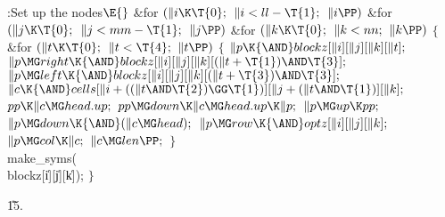 \B{}:Set up the  nodes\X${}\E{}$\6
\&{for} ${}(\|i\K\T{0};{}$ ${}\|i<\\{ll}-\T{1};{}$ ${}\|i\PP){}$\1\6
\&{for} ${}(\|j\K\T{0};{}$ ${}\|j<\\{mm}-\T{1};{}$ ${}\|j\PP){}$\1\6
\&{for} ${}(\|k\K\T{0};{}$ ${}\|k<\\{nn};{}$ ${}\|k\PP){}$\5
${}\{{}$\1\6
\&{for} ${}(\|t\K\T{0};{}$ ${}\|t<\T{4};{}$ ${}\|t\PP){}$\5
${}\{{}$\1\6
${}\|p\K{\AND}\\{blockz}[\|i][\|j][\|k][\|t];{}$\6
${}\|p\MG\\{right}\K{\AND}\\{blockz}[\|i][\|j][\|k][(\|t+\T{1})\AND\T{3}];{}$\6
${}\|p\MG\\{left}\K{\AND}\\{blockz}[\|i][\|j][\|k][(\|t+\T{3})\AND\T{3}];{}$\6
${}\|c\K{\AND}\\{cells}[\|i+((\|t\AND\T{2})\GG\T{1})][\|j+(\|t\AND\T{1})][%
\|k];{}$\6
${}\\{pp}\K\|c\MG\\{head}.\\{up};{}$\6
${}\\{pp}\MG\\{down}\K\|c\MG\\{head}.\\{up}\K\|p;{}$\6
${}\|p\MG\\{up}\K\\{pp};{}$\6
${}\|p\MG\\{down}\K{\AND}(\|c\MG\\{head});{}$\6
${}\|p\MG\\{row}\K{\AND}\\{optz}[\|i][\|j][\|k];{}$\6
${}\|p\MG\\{col}\K\|c;{}$\6
${}\|c\MG\\{len}\PP;{}$\6
\4${}\}{}$\2\6
\\{make\_syms}(\\{blockz}[\|i][\|j][\|k]);\6
\4${}\}{}$\2\2\2\par
\U15.\fi


